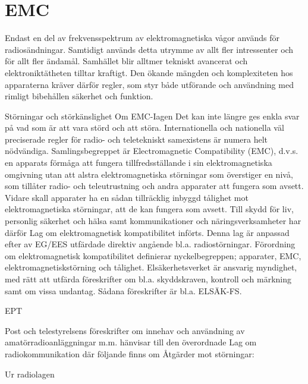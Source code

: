 \chapter{EMC}

Endast en del av frekvensspektrum av elektromagnetiska vågor används för radiosändningar. Samtidigt används detta utrymme av
allt fler intressenter och för allt fler ändamål.
Samhället blir alltmer tekniskt avancerat och
elektroniktätheten tilltar kraftigt. Den ökande mängden och komplexiteten hos apparaterna kräver därför regler, som styr både
utförande och användning med rimligt bibehållen säkerhet och funktion.

Störningar och störkänslighet
Om EMC-Iagen
Det kan inte längre ges enkla svar på vad
som är att vara störd och att störa. Internationella och nationella väl preciserade regler
för radio- och teletekniskt samexistens är
numera helt nödvändiga.
Samlingsbegreppet är Electromagnetic
Compatibility (EMC), d.v.s. en apparats förmåga att fungera tillfredsställande i sin elektromagnetiska omgivning utan att alstra elektromagnetiska störningar som överstiger en
nivå, som tillåter radio- och teleutrustning
och andra apparater att fungera som avsett.
Vidare skall apparater ha en sådan tillräcklig
inbyggd tålighet mot elektromagnetiska störningar, att de kan fungera som avsett.
Till skydd för liv, personlig säkerhet och
hälsa samt kommunikationer och näringsverksamheter har därför Lag om elektromagnetisk kompatibilitet införts. Denna lag
är anpassad efter av EG/EES utfärdade
direktiv angående bl.a. radiostörningar.
Förordning om elektromagnetisk kompatibilitet definierar nyckelbegreppen; apparater, EMC, elektromagnetiskstörning och
tålighet. Elsäkerhetsverket är ansvarig myndighet, med rätt att utfärda föreskrifter om
bl.a. skyddskraven, kontroll och märkning
samt om vissa undantag. Sådana föreskrifter är bl.a. ELSÄK-FS.

EPT

Post och telestyrelsens föreskrifter om innehav och användning av amatörradioanläggningar m.m. hänvisar till den överordnade Lag om radiokommunikation där följande finns om Åtgärder mot störningar:

Ur radiolagen

